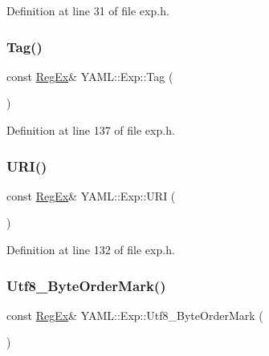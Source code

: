 Definition at line 31 of file exp.\+h.

\mbox{\label{namespace_y_a_m_l_1_1_exp_ab9757a8ce0e5d0c85a9fc71f5256f32e}} 
\subsubsection{\texorpdfstring{Tag()}{Tag()}}
{\footnotesize\ttfamily const \mbox{\hyperlink{class_y_a_m_l_1_1_reg_ex}{Reg\+Ex}}\& Y\+A\+M\+L\+::\+Exp\+::\+Tag (\begin{DoxyParamCaption}{ }\end{DoxyParamCaption})\hspace{0.3cm}{\ttfamily [inline]}}



Definition at line 137 of file exp.\+h.

\mbox{\label{namespace_y_a_m_l_1_1_exp_ad41709a16ebd6dcaa8c69791e4b2960b}} 
\subsubsection{\texorpdfstring{URI()}{URI()}}
{\footnotesize\ttfamily const \mbox{\hyperlink{class_y_a_m_l_1_1_reg_ex}{Reg\+Ex}}\& Y\+A\+M\+L\+::\+Exp\+::\+U\+RI (\begin{DoxyParamCaption}{ }\end{DoxyParamCaption})\hspace{0.3cm}{\ttfamily [inline]}}



Definition at line 132 of file exp.\+h.

\mbox{\label{namespace_y_a_m_l_1_1_exp_adc1bd1e09065b9c19a0307131e2059bb}} 
\subsubsection{\texorpdfstring{Utf8\_ByteOrderMark()}{Utf8\_ByteOrderMark()}}
{\footnotesize\ttfamily const \mbox{\hyperlink{class_y_a_m_l_1_1_reg_ex}{Reg\+Ex}}\& Y\+A\+M\+L\+::\+Exp\+::\+Utf8\+\_\+\+Byte\+Order\+Mark (\begin{DoxyParamCaption}{ }\end{DoxyParamCaption})\hspace{0.3cm}{\ttfamily [inline]}}



